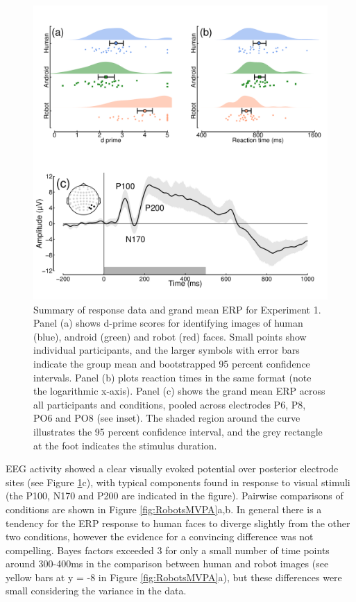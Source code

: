 \documentclass[
]{article}
\begin{document}
\begin{figure}

{\centering \includegraphics{Figures/RobotsData} 

}

\caption{Summary of response data and grand mean ERP for Experiment 1. Panel (a) shows d-prime scores for identifying images of human (blue), android (green) and robot (red) faces. Small points show individual participants, and the larger symbols with error bars indicate the group mean and bootstrapped 95 percent confidence intervals. Panel (b) plots reaction times in the same format (note the logarithmic x-axis). Panel (c) shows the grand mean ERP across all participants and conditions, pooled across electrodes P6, P8, PO6 and PO8 (see inset). The shaded region around the curve illustrates the 95 percent confidence interval, and the grey rectangle at the foot indicates the stimulus duration.}\label{fig:RobotsData}
\end{figure}

EEG activity showed a clear visually evoked potential over posterior electrode sites (see Figure \ref{fig:RobotsData}c), with typical components found in response to visual stimuli (the P100, N170 and P200 are indicated in the figure). Pairwise comparisons of conditions are shown in Figure \ref{fig:RobotsMVPA}a,b. In general there is a tendency for the ERP response to human faces to diverge slightly from the other two conditions, however the evidence for a convincing difference was not compelling. Bayes factors exceeded 3 for only a small number of time points around 300-400ms in the comparison between human and robot images (see yellow bars at y = -8 in Figure \ref{fig:RobotsMVPA}a), but these differences were small considering the variance in the data.
\end{document}
